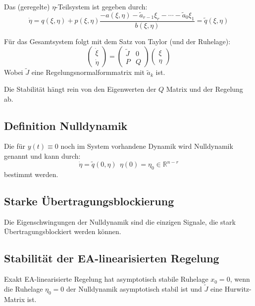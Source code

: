 Das (geregelte) $\eta$-Teilsystem ist gegeben durch:
\begin{equation}
    \dot{\eta} = q(\xi, \eta) + p(\xi, \eta) 
    \frac{-a(\xi, \eta) - \tilde{a}_{r-1} \xi_r - \cdots - \tilde{a}_0 \xi_1}{b(\xi, \eta)}
    = \tilde{q}(\xi, \eta)
\end{equation}

Für das Gesamtsystem folgt mit dem Satz von Taylor (und der Ruhelage):
\begin{equation}
    \begin{pmatrix} \dot{\xi} \\ \dot{\eta} \end{pmatrix} =
    \begin{pmatrix} \tilde{J} & 0 \\ P & Q \end{pmatrix}
    \begin{pmatrix} \xi \\ \eta \end{pmatrix}
\end{equation}
Wobei $\tilde{J}$ eine Regelungsnormalformmatrix mit $\tilde{a}_k$ ist.

Die Stabilität hängt rein von den Eigenwerten der $Q$ Matrix und der Regelung ab.

\subsection{Definition Nulldynamik}
Die für $y(t) \equiv 0$ noch im System vorhandene Dynamik wird Nulldynamik genannt
und kann durch:
\begin{equation}
    \dot{\eta} = \tilde{q}(0, \eta)\ \ \eta(0) = \eta_0 \in \mathbb{R}^{n-r}
\end{equation}
bestimmt werden.

\subsection{Starke Übertragungsblockierung}
Die Eigenschwingungen der Nulldynamik sind die einzigen Signale, die stark Übertragungsblockiert werden können.

\subsection{Stabilität der EA-linearisierten Regelung}
Exakt EA-linearisierte Regelung hat asymptotisch stabile Ruhelage $x_0 = 0$, wenn die
Ruhelage $\eta_0 = 0$ der Nulldynamik asymptotisch stabil ist und $\tilde{J}$ eine Hurwitz-Matrix
ist.

